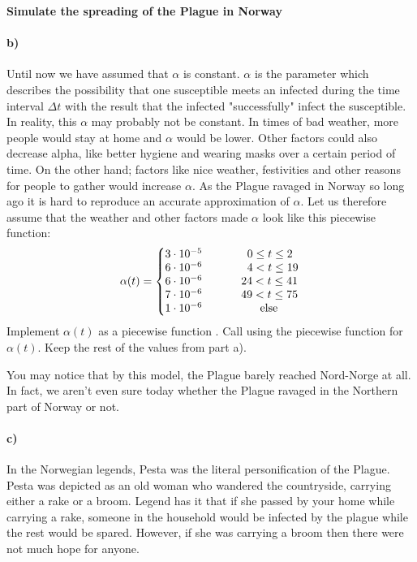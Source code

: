 \begin{Problem}{\textbf{Simulate the spreading of the Plague in Norway}}
\paragraph{b)}
Until now we have assumed that $\alpha$ is constant. $\alpha$ is the parameter which describes the possibility that one susceptible meets an infected during the time interval $\Delta t$ with the result that the infected "successfully" infect the susceptible. In reality, this $\alpha$ may probably not be constant. In times of bad weather, more people would stay at home and $\alpha$ would be lower. Other factors could also decrease alpha, like better hygiene and wearing masks over a certain period of time. On the other hand; factors like nice weather, festivities and other reasons for people to gather would increase $\alpha$. 
As the Plague ravaged in Norway so long ago it is hard to reproduce an accurate approximation of $\alpha$. Let us therefore assume that the weather and other factors made $\alpha$ look like this piecewise function:
\[
  \alpha(t) = \left\{
     \begin{array}{@{}l@{\thinspace}l}
      3 \cdot 10^{-5}  \hspace*{14mm}  0 \leq t \leq 2 \\
      6 \cdot 10^{-6} \hspace*{14mm} 4 < t \leq 19 \\
      6 \cdot 10^{-6} \hspace*{12.1mm} 24 < t \leq 41 \\
      7 \cdot 10^{-6}  \hspace{12.1mm} 49 < t \leq 75\\
      1 \cdot 10^{-6} \hspace{18mm} \text{else}
     \end{array}
   \right.
\]
Implement $\alpha(t)$ as a piecewise function . Call  using the piecewise function for $\alpha (t)$. Keep the rest of the values from part a).

You may notice that by this model, the Plague barely reached Nord-Norge at all. In fact, we aren't even sure today whether the Plague ravaged in the Northern part of Norway or not.

\paragraph{c)}

In the Norwegian legends, Pesta was the literal personification of the Plague. Pesta was depicted as an old woman who wandered the countryside, carrying either a rake or a broom. Legend has it that if she passed by your home while carrying a rake,  someone in the household would be infected by the plague while the rest would be spared. However, if she was carrying a broom then there were not much hope for anyone.


\end{Problem}
